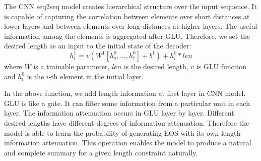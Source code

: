 
%
The CNN seq2seq model creates hierarchical
structure over the input sequence. It is capable of capturing the
correlation between elements over short distances at lower layers
and between elements over long distances at higher layers. 
The useful information among the elements is aggregated after GLU.
Therefore, we set the desired length as an input to the initial state of the decoder:
\begin{equation}
h^{1}_{i} \!=\! v(W^{1}[h^{0}_{s},...,h^{0}_{t}]\!+\!b^1)\!+\!h^{0}_{i}*len
\end{equation}
where $W$ is a trainable parameter, $len$ is the desired length, 
$v$ is GLU funciton and $h^{0}_{i}$ is the $i$-th element in the initial layer.

In the above function, we add length information at first 
layer in CNN model. GLU is like a gate. It can filter some information
from a particular unit in each layer. The information attenuation occurs in GLU
layer by layer. Different desired lengths have different degrees of information 
attenuation. Therefore the model is able to learn the probability of generating 
EOS with its own length information attenuation. 
This operation enables the model to produce a natural and complete summary 
for a given length constraint naturally. 

